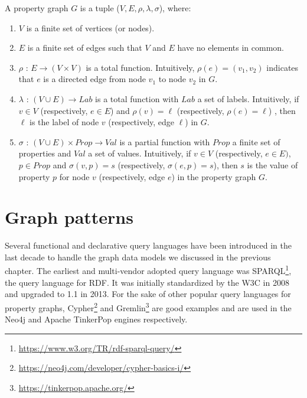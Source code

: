 \begin{definition}\label{def:property_graph}\cite{DBLP:journals/csur/AnglesABHRV17}
A property graph $G$ is a tuple (\textit{$V, E, \rho, \lambda, \sigma$}), where:

\begin{enumerate}
  \item $V$ is a finite set of vertices (or nodes).
  \item $E$ is a finite set of edges such that $V$ and $E$ have no elements in common.
  \item $\rho$ : $E \rightarrow (V \times V)$ is a total function. Intuitively, $\rho(e) = (v_1, v_2)$ indicates that $e$ is a directed
  edge from node $v_1$ to node $v_2$ in $G$.
  \item $\lambda$ : $(V \cup E) \rightarrow Lab$ is a total function with $\textit{Lab}$ a set of labels. Intuitively, if $v \in V$ (respectively, $e \in E$) and $\rho(v) = \ell$ (respectively, $\rho(e) = \ell$) , then $\ell$ is the label of node $v$ (respectively, edge $\ell$) in $G$.
  \item $\sigma$ : $(V \cup E) \times \textit{Prop} \rightarrow \textit{Val}$ is a partial function with $\textit{Prop}$ a finite set of properties and $\textit{Val}$
  a set of values. Intuitively, if $v \in V$ (respectively, $e \in E)$, $p \in \textit{Prop}$ and $\sigma (v,p) = s$ (respectively, $\sigma (e,p) = s$), then $s$ is the value of property $p$ for node $v$ (respectively, edge $e$) in the
  property graph $G$.
\end{enumerate}
\end{definition}

\section{Graph patterns}

Several functional and declarative query languages have been introduced in the last decade to handle the graph data models we discussed in the previous chapter.
The earliest and multi-vendor adopted query language was SPARQL\footnote{\url{https://www.w3.org/TR/rdf-sparql-query/}}, the query language for RDF.
It was initially standardized by the W3C in 2008 and upgraded to 1.1 in 2013.
For the sake of other popular query languages for property graphs, Cypher\footnote{\url{https://neo4j.com/developer/cypher-basics-i/}} and Gremlin\footnote{\url{https://tinkerpop.apache.org/}} are good examples and are used in the Neo4j and Apache TinkerPop engines respectively.

